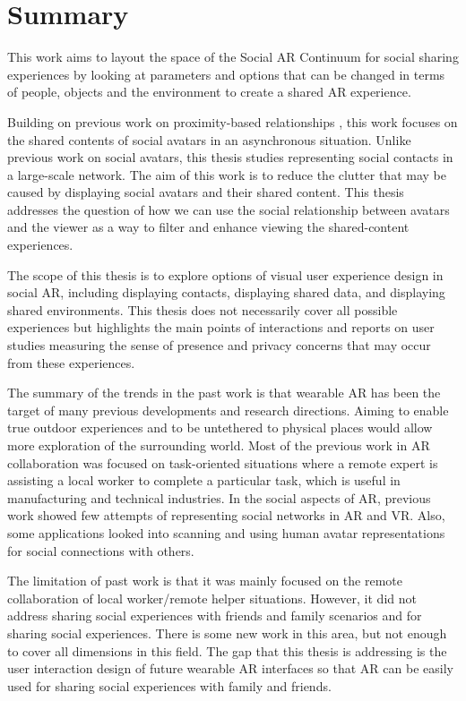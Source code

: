\section{Summary}

This work aims to layout the space of the Social AR Continuum for social sharing experiences by looking at parameters and options that can be changed in terms of people, objects and the environment to create a shared AR experience. 

Building on previous work on proximity-based relationships \cite{Sousa2016}, this work focuses on the shared contents of social avatars in an asynchronous situation. Unlike previous work on social avatars, this thesis studies representing social contacts in a large-scale network. The aim of this work is to reduce the clutter that may be caused by displaying social avatars and their shared content. This thesis addresses the question of how we can use the social relationship between avatars and the viewer as a way to filter and enhance viewing the shared-content experiences. 

The scope of this thesis is to explore options of visual user experience design in social AR, including displaying contacts, displaying shared data, and displaying shared environments. This thesis does not necessarily cover all possible experiences but highlights the main points of interactions and reports on user studies measuring the sense of presence and privacy concerns that may occur from these experiences. 

The summary of the trends in the past work is that wearable AR has been the target of many previous developments and research directions. Aiming to enable true outdoor experiences and to be untethered to physical places would allow more exploration of the surrounding world. 
Most of the previous work in AR collaboration was focused on task-oriented situations where a remote expert is assisting a local worker to complete a particular task, which is useful in manufacturing and technical industries.
In the social aspects of AR, previous work showed few attempts of representing social networks in AR and VR. Also, some applications looked into scanning and using human avatar representations for social connections with others.

The limitation of past work is that it was mainly focused on the remote collaboration of local worker/remote helper situations. However, it did not address sharing social experiences with friends and family scenarios and for sharing social experiences. There is some new work in this area, but not enough to cover all dimensions in this field. The gap that this thesis is addressing is the user interaction design of future wearable AR interfaces so that AR can be easily used for sharing social experiences with family and friends. 

